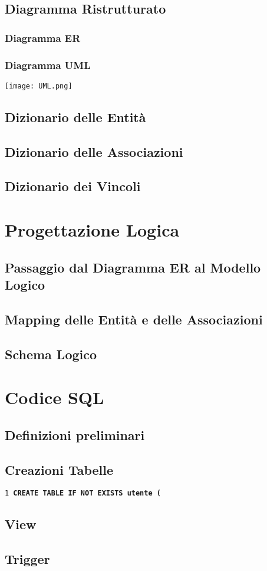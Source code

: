 \documentclass[a4paper,12pt,oneside]{book}
\begin{document}
    \section{Diagramma Ristrutturato}
    \subsection{Diagramma ER}
    
    \subsection{Diagramma UML}
    \texttt{[image: UML.png]}
    
    \section{Dizionario delle Entità}
    
    \section{Dizionario delle Associazioni}
    \section{Dizionario dei Vincoli}

    \chapter{Progettazione Logica}
    \section{Passaggio dal Diagramma ER al Modello Logico}
    \section{Mapping delle Entità e delle Associazioni}
    \section{Schema Logico}
    \chapter{Codice SQL}
    \section{Definizioni preliminari}
    \section{Creazioni Tabelle}

    \texttt{1 \bfseries{CREATE TABLE IF NOT EXISTS} utente (}
    \section{View}
    \section{Trigger}
    \label{sec:Intro}
\end{document}
